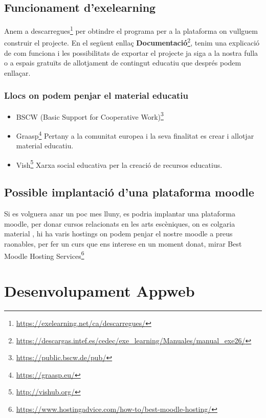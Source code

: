\documentclass[
  10pt,
]{krantz}
\DeclareRobustCommand{\href}[2]{#2\footnote{\url{#1}}}
\providecommand{\tightlist}{%
  \setlength{\itemsep}{0pt}\setlength{\parskip}{0pt}}
\begin{document}
\hypertarget{funcionament-dexelearning}{%
\section{Funcionament d'exelearning}\label{funcionament-dexelearning}}

Anem a \href{https://exelearning.net/ca/descarregues/}{descarregues} per obtindre el programa per a la plataforma on vullguem construir el projecte. En el següent enllaç \href{https://descargas.intef.es/cedec/exe_learning/Manuales/manual_exe26/}{\textbf{Documentació}}, tenim una explicació de com funciona i les possibilitats de exportar el projecte ja siga a la nostra fulla o a espais gratuïts de allotjament de contingut educatiu que després podem enllaçar.

\hypertarget{llocs-on-podem-penjar-el-material-educatiu}{%
\subsection{Llocs on podem penjar el material educatiu}\label{llocs-on-podem-penjar-el-material-educatiu}}

\begin{itemize}
\tightlist
\item
  \href{https://public.bscw.de/pub/}{BSCW (Basic Support for Cooperative Work)}
\item
  \href{https://graasp.eu/}{Graasp} Pertany a la comunitat europea i la seva finalitat es crear i allotjar material educatiu.
\item
  \href{http://vishub.org/}{Vish} Xarxa social educativa per la creació de recursos educatius.
\end{itemize}

\hypertarget{possible-implantaciuxf3-duna-plataforma-moodle}{%
\section{Possible implantació d'una plataforma moodle}\label{possible-implantaciuxf3-duna-plataforma-moodle}}

Si es volguera anar un poc mes lluny, es podria implantar una plataforma moodle, per donar cursos relacionats en les arts escèniques, on es colgaria material , hi ha varis hostings on podem penjar el nostre moodle a preus raonables, per fer un curs que ens interese en un moment donat, mirar \href{https://www.hostingadvice.com/how-to/best-moodle-hosting/}{Best Moodle Hosting Services}

\hypertarget{desenvolupament-appweb}{%
\chapter{Desenvolupament Appweb}\label{desenvolupament-appweb}}
\end{document}
